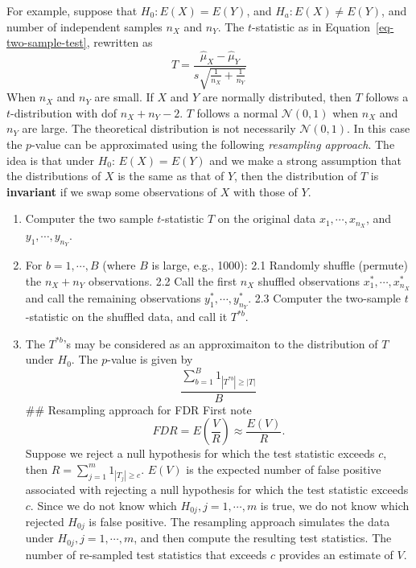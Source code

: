 \documentclass[
  letterpaper,
  DIV=11,
  numbers=noendperiod]{scrreprt}
\begin{document}
{{For example, suppose that \(H_0: E(X)= E(Y)\), and
\(H_a: E(X)\ne E(Y)\), and number of independent samples \(n_X\) and
\(n_Y\). The \(t\)-statistic as in Equation~\ref{eq-two-sample-test},
rewritten as \[
T=\frac{\hat{\mu}_X - \hat{\mu}_Y}{s\sqrt{\frac{1}{n_X}+ \frac{1}{n_Y}}}
\] When \(n_X\) and \(n_Y\) are small. If \(X\) and \(Y\) are normally
distributed, then \(T\) follows a \(t\)-distribution with dof
\(n_X+n_Y-2\). \(T\) follows a normal \(\mathcal{N}(0,1)\) when \(n_X\)
and \(n_Y\) are large. The theoretical distribution is not necessarily
\(\mathcal{N}(0,1)\). In this case the \(p\)-value can be approximated
using the following \emph{resampling approach}. The idea is that under
\(H_0\): \(E(X)=E(Y)\) and we make a strong assumption that the
distributions of \(X\) is the same as that of \(Y\), then the
distribution of \(T\) is \textbf{invariant} if we swap some observations
of \(X\) with those of \(Y\).

\begin{enumerate}
\def\labelenumi{\arabic{enumi}.}
\item
  Computer the two sample \(t\)-statistic \(T\) on the original data
  \(x_1, \cdots, x_{n_X}\), and \(y_1, \cdots, y_{n_Y}\).
\item
  For \(b=1, \cdots, B\) (where \(B\) is large, e.g., 1000): 2.1
  Randomly shuffle (permute) the \(n_X+n_Y\) observations. 2.2 Call the
  first \(n_X\) shuffled observations \(x_1^*, \cdots, x_{n_X}^*\) and
  call the remaining observations \(y_1^*, \cdots, y_{n_Y}^*\). 2.3
  Computer the two-sample \(t\)-statistic on the shuffled data, and call
  it \(T^{*b}\).
\item
  The \(T^{*b}\)'s may be considered as an approximaiton to the
  distribution of \(T\) under \(H_0\). The \(p\)-value is given by \[
  \frac{\sum_{b=1}^B 1_{|T^{*b}|\ge |T|}}{B}
  \] \#\# Resampling approach for FDR First note \[
  FDR =E\left( \frac{V}{R} \right) \approx \frac{E(V)}{R}.
  \] Suppose we reject a null hypothesis for which the test statistic
  exceeds \(c\), then \(R=\sum_{j=1}^m 1_{|T_j|\ge c}.\) \(E(V)\) is the
  expected number of false positive associated with rejecting a null
  hypothesis for which the test statistic exceeds \(c\). Since we do not
  know which \(H_{0j}, j=1, \cdots, m\) is true, we do not know which
  rejected \(H_{0j}\) is false positive. The resampling approach
  simulates the data under \(H_{0j}, j=1, \cdots, m\), and then compute
  the resulting test statistics. The number of re-sampled test
  statistics that exceeds \(c\) provides an estimate of \(V\).
\end{enumerate}

}}
\end{document}
